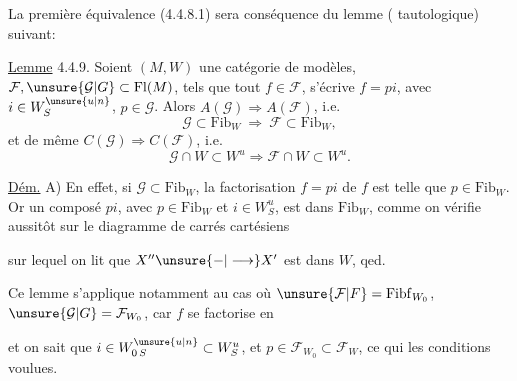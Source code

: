 \unsure{--} La première équivalence (4.4.8.1) sera conséquence du lemme (\inserted{$\pm$} tautologique) suivant:

\uline{Lemme} 4.4.9. Soient $(M,W)$ une catégorie de modèles, $\mathcal{F},\unsure{\mathcal{G}|G}\subset\mathrm{Fl}(M)$, tels que tout $f\in\mathcal{F}$,  s'écrive $f=pi$, avec $i\in W^{\unsure{u|n}}_S$, $p\in\mathcal{G}$. Alors $A(\mathcal{G})\Longrightarrow A(\mathcal{F})$, i.e.
\[
 \mathcal{G}\subset\mathrm{Fib}_{W}\ \Longrightarrow\ \mathcal{F}\subset\mathrm{Fib}_{W}, \tag*{(4.4.9.1)}
\]
et de même  $C(\mathcal{G})\Longrightarrow C(\mathcal{F})$, i.e.
\[
 \mathcal{G}\cap W\subset W^u\Longrightarrow\mathcal{F}\cap W\subset W^u. \tag*{(4.4.9.2)}
\]

\uline{Dém.} A) En effet, si  $\mathcal{G}\subset\mathrm{Fib}_{W}$, la factorisation $f=pi$ de $f$ est telle que $p\in\mathrm{Fib}_{W}$. Or un composé $pi$, avec $p\in\mathrm{Fib}_{W}$ et $i\in W_S^u$, est dans $\mathrm{Fib}_{W}$, comme on vérifie aussitôt sur le diagramme de carrés cartésiens


sur lequel on lit que $X''\unsure{\mathbin{-}|\longrightarrow}X'$ est dans $W$, qed.

Ce lemme s'applique notamment au cas où $\unsure{\mathcal{F}|F}=\mathrm{Fibf}_{W_0}$, $\unsure{\mathcal{G}|G}=\mathcal{F}_{W_0}$, car $f$ se factorise en


et on sait que $i\in W_{0\,S}^{\unsure{u|n}}\subset W_S^u$, et $p\in\mathcal{F}_{W_0}\subset\mathcal{F}_{W}$, ce qui  les conditions voulues.

